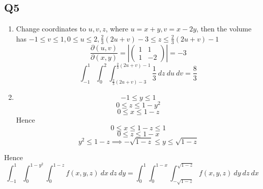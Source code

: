 \documentclass{article}
\newcommand{\p}[2]{\frac{\partial #1}{\partial #2}}
\newcommand{\abs}[1]{\left| #1 \right|}
\begin{document}
\subsection*{Q5}

\begin{enumerate}[label=\alph*.]
\item Change coordinates to $u,v,z$, where $u=x+y, v=x-2y$, then the volume has $-1 \leq v \leq 1, 0 \leq u \leq 2, \frac{2}{3}(2u+v) -3 \leq z \leq \frac{2}{3}(2u+v) -1$
\[\p{(u,v)}{(x,y)} = \abs{\begin{pmatrix}
1 & 1 \\ 1 & -2
\end{pmatrix}} = -3\]
\[
\int_{-1}^1 \int_0^2 \int_{\frac{2}{3}(2u+v)-3}^{\frac{2}{3}(2u+v) -1} \frac{1}{3}\ dz\ du\ dv = \frac{8}{3}
\]

\item
\[-1 \leq y \leq 1\]
\[0 \leq z \leq 1-y^2\]
\[0 \leq x \leq 1-z\]
Hence
\[0 \leq x \leq 1-z \leq 1\]
\[0 \leq z \leq 1-x\]
\[y^2 \leq 1-z \implies -\sqrt{1-z} \leq y \leq \sqrt{1-z}\]
\end{enumerate}
Hence
\[\int_{-1}^{1} \int_0^{1-y^2} \int_0^{1-z} f(x,y,z)\ dx\ dz\ dy = \int_0^1 \int_0^{1-x} \int_{-\sqrt{1-z}}^{\sqrt{1-z}} f(x,y,z)\ dy\ dz\ dx\]
\end{document}
